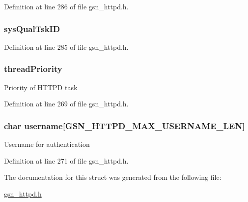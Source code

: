 Definition at line 286 of file gsn\_\-httpd.h.

\hypertarget{a00095_a3e06cb8fa58f49b7004a85c6f387ddc7}{
\subsubsection[{sysQualTskID}]{ {\bf sysQualTskID}}}
\label{a00095_a3e06cb8fa58f49b7004a85c6f387ddc7}


Definition at line 285 of file gsn\_\-httpd.h.

\hypertarget{a00095_a43d5ee14f34535c187383f957878ccbd}{
\subsubsection[{threadPriority}]{ {\bf threadPriority}}}
\label{a00095_a43d5ee14f34535c187383f957878ccbd}
Priority of HTTPD task 

Definition at line 269 of file gsn\_\-httpd.h.

\hypertarget{a00095_a0c0fcc39f73de9a78d2b8866e3164a46}{
\subsubsection[{username}]{\setlength{\rightskip}{0pt plus 5cm}char {\bf username}\mbox{[}GSN\_\-HTTPD\_\-MAX\_\-USERNAME\_\-LEN\mbox{]}}}
\label{a00095_a0c0fcc39f73de9a78d2b8866e3164a46}
Username for authentication 

Definition at line 271 of file gsn\_\-httpd.h.



The documentation for this struct was generated from the following file:\begin{DoxyCompactItemize}
\item 
\hyperlink{a00508}{gsn\_\-httpd.h}\end{DoxyCompactItemize}
